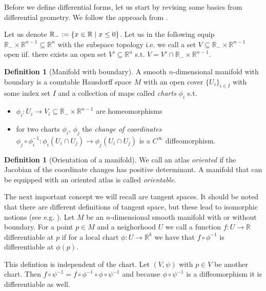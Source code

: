\documentclass[12pt,a4paper]{article}
\numberwithin{equation}{subsection}
\numberwithin{lemma}{subsection}
\theoremstyle{definition}
\newtheorem{definition}[lemma]{Definition}
\newcommand{\real}{\mathbb{R}}
\begin{document}
Before we define differential forms, let us start by revising some basics
from differential geometry. We follow the approach from 
\cite[Sec. II]{topology_and_geometry}. 

Let us denote $\real_- \vcentcolon= \{ x \in \real \mid x \leq 0 \}$. 
Let us in the following equip $\real_- \times \real^{n-1} \subseteq \real^n$ with the 
subspace topology i.e. we call a set $V \subseteq \real_- \times \real^{n-1}$ 
open iif. there exists an open set $V' \subseteq \real^n$ s.t. 
$V = V' \cap \real_- \times \real^{n-1}$. 
\begin{definition}[Manifold with boundary]
    A smooth $n$-dimensional manifold with boundary is a countable Hausdorff 
    space $M$ with an open cover $\{ U_i \} _{i\in I}$ with some index set $I$ 
    and a collection of maps called \textit{charts} $\phi_i$ s.t.
    \begin{itemize}
        \item $\phi_i: U_i \rightarrow V_i \subseteq \real_- \times \real^{n-1}$
            are homeomorphisms
        \item for two charts $\phi_i$, $\phi_j$ the 
            \textit{change of coordinates} $\phi_j \circ \phi_i^{-1}: 
            \phi_i(U_i \cap U_j) \rightarrow \phi_j(U_i \cap U_j)$ 
            is a $C^\infty$ diffeomorphism.
    \end{itemize}
\end{definition}

\begin{definition}[Orientation of a manifold]
    We call an atlas \textit{oriented} if the Jacobian of the coordinate
    changes has positive determinant. A manifold that can be equipped with 
    an oriented atlas is called \textit{orientable}.
\end{definition}

The next important concept we will recall are tangent spaces. 
It should be noted that there are different definitions of tangent space, but
these lead to isomorphic notions 
(see e.g. \cite[Sec.\,1.B]{riemannian_geometry}).
Let $M$ be an $n$-dimensional smooth manifold with or without boundary.
For a point $p \in M$ and a neighorhood $U$ we call a function 
$f: U \rightarrow \real$ differentiable at $p$ if for a local chart 
$\phi: U \rightarrow \real^k$ we have that $f \circ \phi^{-1}$ is differentiable
at $\phi(p)$.

This defintion is independent of the chart. Let $(V,\psi)$ with $p \in V$ be 
another chart. 
Then $f\circ \psi^{-1} = f \circ \phi^{-1} \circ \phi \circ \psi^{-1}$ and 
because $\phi \circ \psi^{-1}$ is a diffeomorphism it is differentiable as well.
\end{document}
